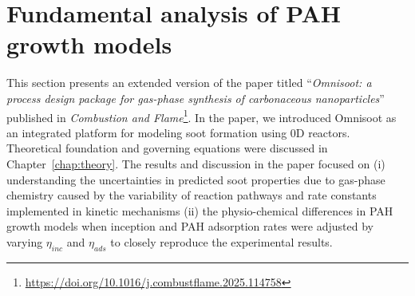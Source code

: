 \section{Fundamental analysis of PAH growth models}
\label{sec:paper1_fanalysis_inception_models}

This section presents an extended version of the paper titled ``\textit{Omnisoot: a process design package for gas-phase synthesis of carbonaceous nanoparticles}'' published in \textit{Combustion and Flame}\footnote{\href{https://doi.org/10.1016/j.combustflame.2025.114758}{https://doi.org/10.1016/j.combustflame.2025.114758}}. In the paper, we introduced Omnisoot as an integrated platform for modeling soot formation using 0D reactors. Theoretical foundation and governing equations were discussed in Chapter~\ref{chap:theory}. The results and discussion in the paper focused on (i) understanding the uncertainties in predicted soot properties due to gas-phase chemistry caused by the variability of reaction pathways and rate constants implemented in kinetic mechanisms (ii) the physio-chemical differences in PAH growth models when inception and PAH adsorption rates were adjusted by varying $\eta_{inc}$ and $\eta_{ads}$ to closely reproduce the experimental results.

